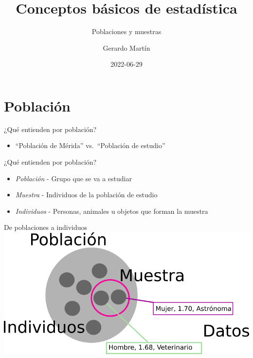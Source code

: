 \documentclass[
  11pt,
  ignorenonframetext,
]{beamer}
\title{Conceptos básicos de estadística}
\subtitle{Poblaciones y muestras}
\author{Gerardo Martín}
\date{2022-06-29}
\providecommand{\tightlist}{%
  \setlength{\itemsep}{0pt}\setlength{\parskip}{0pt}}
\begin{document}
\frame{\titlepage}

\hypertarget{poblaciuxf3n}{%
\section{Población}\label{poblaciuxf3n}}

\begin{frame}{¿Qué entienden por población?}
\protect\hypertarget{quuxe9-entienden-por-poblaciuxf3n}{}
\begin{itemize}
\tightlist
\item
  ``Población de Mérida'' vs.~``Población de estudio''
\end{itemize}
\end{frame}

\begin{frame}{¿Qué entienden por población?}
\protect\hypertarget{quuxe9-entienden-por-poblaciuxf3n-1}{}
\begin{itemize}
\tightlist
\item
  \emph{Población} - Grupo que se va a estudiar
\item
  \emph{Muestra} - Individuos de la población de estudio
\item
  \emph{Individuos} - Personas, animales u objetos que forman la muestra
\end{itemize}
\end{frame}

\begin{frame}{De poblaciones a individuos}
\protect\hypertarget{de-poblaciones-a-individuos}{}
\includegraphics{Figuras-Intro/Poblacion-indiv.png}
\end{frame}
\end{document}

